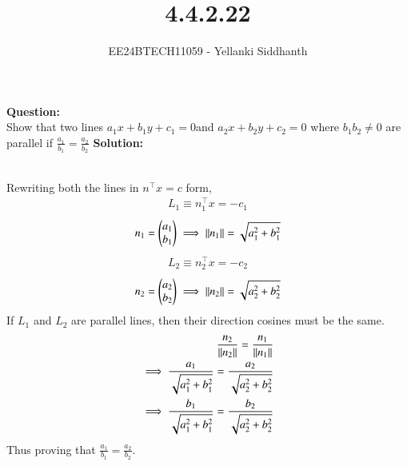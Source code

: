 \documentclass[journal]{IEEEtran}
\begin{document}
	
	
	\vspace{3cm}
	
	\title{4.4.2.22}
	\author{EE24BTECH11059 - Yellanki Siddhanth
	}
	{\let\newpage\relax\maketitle}
	
	\renewcommand{\thefigure}{\theenumi}
	\renewcommand{\thetable}{\theenumi}
	\setlength{\intextsep}{10pt} %
	
	
	\renewcommand{\thetable}{\theenumi}
	
\textbf{Question: }\\
Show that two lines  $a_1 x+ b_1y + c_1 = 0 $and $a_2 x+ b_2 y + c_2 = 0$ where $b_1 b_2 \neq 0$ are parallel if
$\frac{a_1}{b_1} = \frac{a_2}{b_2}$
\textbf{Solution: } \\
\begin{table}[h!]    
	\centering
	
	\caption{}
\end{table}\\
Rewriting both the lines in $n^\top x = c$ form,
	\begin{align}
		L_1 \equiv n_1^\top x = -c_1
	\end{align}
	\begin{align}
		n_1 = \begin{pmatrix}a_1 \\ b_1\end{pmatrix}  \implies 		\left\lVert n_1\right\rVert = \sqrt{a_1^2 + b_1^2}
	\end{align}
	\begin{align}
		L_2 \equiv n_2^\top x = -c_2
	\end{align}
	\begin{align}
		n_2 = \begin{pmatrix}a_2 \\ b_2\end{pmatrix}  \implies 		\left\lVert n_2\right\rVert = \sqrt{a_2^2 + b_2^2}
	\end{align}
If $L_1$ and $L_2$ are parallel lines, then their direction cosines must be the same.
	\begin{align}
		\frac{n_2}{\left\lVert n_2\right\rVert} = \frac{n_1}{\left\lVert n_1\right\rVert}\\
		 \implies \frac{a_1}{\sqrt{a_1^2 + b_1^2}} = \frac{a_2}{\sqrt{a_2^2 + b_2^2}}\\
		 \implies \frac{b_1}{\sqrt{a_1^2 + b_1^2}} = \frac{b_2}{\sqrt{a_2^2 + b_2^2}}
	\end{align}
	Thus proving that $\frac{a_1}{b_1} = \frac{a_2}{b_2}$.\\
	
\end{document}

